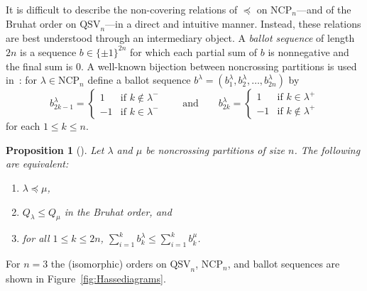 \documentclass[12pt]{amsart}
\newtheorem{prop}[equation]{Proposition}
\theoremstyle{definition}
\theoremstyle{remark}
\numberwithin{equation}{section}
\newcommand{\QSV}{\mathrm{QSV}}
\newcommand{\NCP}{\mathrm{NCP}}
\begin{document}
It is difficult to describe the non-covering relations of $\preceq$ on $\NCP_{n}$---and of the Bruhat order on $\QSV_{n}$---in a direct and intuitive manner.  Instead, these relations are best understood through an intermediary object.  A \emph{ballot sequence} of length $2n$ is a sequence $b \in \{\pm1\}^{2n}$ for which each partial sum of $b$ is nonnegative and the final sum is $0$.  A well-known bijection between noncrossing partitions is used in~\cite[Section~5.1]{GobetWilliams}: for $\lambda \in \NCP_{n}$ define a ballot sequence $b^{\lambda} = (b^{\lambda}_{1}, b^{\lambda}_{2}, \ldots, b^{\lambda}_{2n})$  by
\[
b^{\lambda}_{2 k - 1} = \begin{cases} 1 & \text{if $k \notin \lambda^{-}$} \\ -1 & \text{if $k \in \lambda^{-}$} \end{cases}
\qquad
\text{and}
\qquad
b^{\lambda}_{2 k} = \begin{cases} 1 & \text{if $k \in \lambda^{+}$} \\ -1 & \text{if $k \notin \lambda^{+}$} \end{cases}
\]
for each $1 \le k \le n$.

\begin{prop}[{\cite[Theorem 1.1 and Corollary 7.5]{GobetWilliams}}]
\label{prop:QSVorderbijection}
Let $\lambda$ and $\mu$ be noncrossing partitions of size $n$.  The following are equivalent:
\begin{enumerate}
\item $\lambda \preceq \mu$, 

\item $Q_{\lambda} \le Q_{\mu}$ in the Bruhat order, and

\item for all $1 \le k \le 2n$, $\sum_{i = 1}^{k} b^{\lambda}_{k} \le \sum_{i = 1}^{k} b^{\mu}_{k}$.

\end{enumerate}
\end{prop}

For $n = 3$ the (isomorphic) orders on $\QSV_{n}$, $\NCP_{n}$, and ballot sequences are shown in Figure~\ref{fig:Hassediagrams}.
\end{document}
